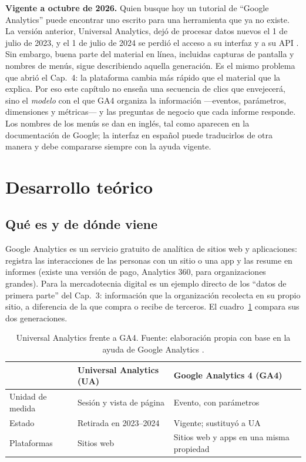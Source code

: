 \textbf{Vigente a octubre de 2026.} Quien busque hoy un tutorial de
\enquote{Google Analytics} puede encontrar uno escrito para una herramienta
que ya no existe. La versión anterior, Universal Analytics, dejó de procesar
datos nuevos el 1 de julio de 2023, y el 1 de julio de 2024 se perdió el
acceso a su interfaz y a su API \parencite{google2026ga4ua}. Sin embargo,
buena parte del material en línea, incluidas capturas de pantalla y nombres
de menús, sigue describiendo aquella generación. Es el mismo problema que
abrió el Cap.~4: la plataforma cambia más rápido que el material que la
explica. Por eso este capítulo no enseña una secuencia de clics que
envejecerá, sino el \emph{modelo} con el que GA4 organiza la información
—eventos, parámetros, dimensiones y métricas— y las preguntas de negocio que
cada informe responde. Los nombres de los menús se dan en inglés, tal como
aparecen en la documentación de Google; la interfaz en español puede
traducirlos de otra manera y debe compararse siempre con la ayuda vigente.

\section{Desarrollo teórico}

\subsection{Qué es y de dónde viene}

Google Analytics es un servicio gratuito de analítica de sitios web y
aplicaciones: registra las interacciones de las personas con un sitio o una
app y las resume en informes (existe una versión de pago, Analytics 360, para
organizaciones grandes). Para la mercadotecnia digital es un ejemplo directo
de los \enquote{datos de primera parte} del Cap.~3: información que la
organización recolecta en su propio sitio, a diferencia de la que compra o
recibe de terceros. El cuadro~\ref{tab:cap05-ua-ga4} compara sus dos
generaciones.

\begin{table}[!htb]
\centering
\begin{tabular}{@{}p{3.2cm}p{4.5cm}p{4.7cm}@{}}
\toprule
 & Universal Analytics (UA) & Google Analytics 4 (GA4) \\
\midrule
Unidad de medida & Sesión y vista de página & Evento, con parámetros \\
Estado & Retirada en 2023--2024 & Vigente; sustituyó a UA \\
Plataformas & Sitios web & Sitios web y apps en una misma propiedad \\
\bottomrule
\end{tabular}
\caption{Universal Analytics frente a GA4. Fuente: elaboración propia con base
en la ayuda de Google Analytics \parencite{google2026ga4ua}.}
\label{tab:cap05-ua-ga4}
\end{table}

